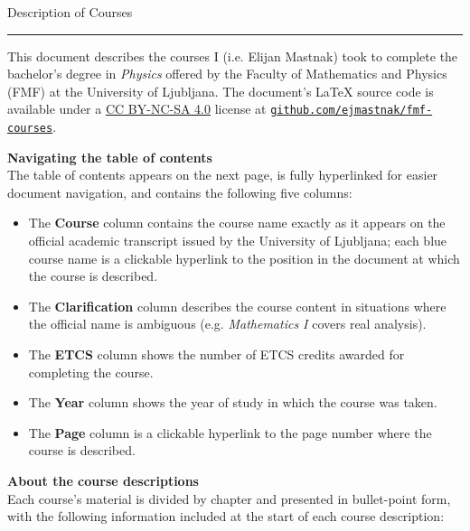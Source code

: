 \documentclass[11pt, a4paper]{article}
\begin{document}
\pagestyle{empty}  %

\begin{center}
\thispagestyle{empty}
\null
\vspace{20ex}
{\Huge Description of Courses}
\rule{0.7\textwidth}{0.5pt}
\vspace{2ex}

\begin{minipage}[t]{0.90\textwidth}
    This document describes the courses I (i.e. Elijan Mastnak) took to complete the bachelor's degree in \textit{Physics} offered by the Faculty of Mathematics and Physics (FMF) at the University of Ljubljana.
    The document's \LaTeX{} source code is available under a \href{http://creativecommons.org/licenses/by-nc-sa/4.0/}{CC BY-NC-SA 4.0} license at \href{https://github.com/ejmastnak/fmf-courses}{\texttt{github.com/ejmastnak/fmf-courses}}.

    \vspace{2ex}
    \textbf{\large Navigating the table of contents}\\[0.5ex]
    The table of contents appears on the next page, is fully hyperlinked for easier document navigation, and contains the following five columns:
    \begin{itemize}
        \item The \textbf{Course} column contains the course name exactly as it appears on the official academic transcript issued by the University of Ljubljana;
        each blue course name is a clickable hyperlink to the position in the document at which the course is described.

        \item The \textbf{Clarification} column describes the course content in situations where the official name is ambiguous (e.g. \textit{Mathematics I} covers real analysis).

        \item The \textbf{ETCS} column shows the number of ETCS credits awarded for completing the course.

        \item The \textbf{Year} column shows the year of study in which the course was taken.

        \item The \textbf{Page} column is a clickable hyperlink to the page number where the course is described.

    \end{itemize}

    \vspace{2ex}
    \textbf{\large About the course descriptions}\\[0.5ex]
    Each course's material is divided by chapter and presented in bullet-point form, with the following information included at the start of each course description:
    \begin{itemize}
    

\end{itemize}
\end{minipage}
\end{center}
\end{document}
